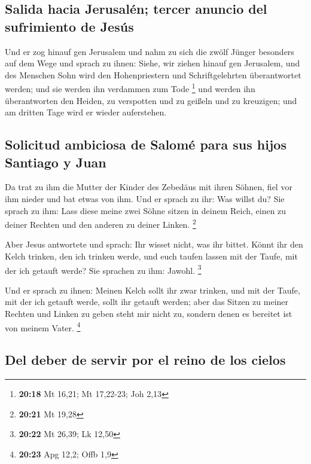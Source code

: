 \hypertarget{salida-hacia-jerusaluxe9n-tercer-anuncio-del-sufrimiento-de-jesuxfas}{%
\subsection{Salida hacia Jerusalén; tercer anuncio del sufrimiento de
Jesús}\label{salida-hacia-jerusaluxe9n-tercer-anuncio-del-sufrimiento-de-jesuxfas}}

 Und er zog hinauf gen Jerusalem und nahm zu sich die
zwölf Jünger besonders auf dem Wege und sprach zu ihnen: 
Siehe, wir ziehen hinauf gen Jerusalem, und des Menschen Sohn wird den
Hohenpriestern und Schriftgelehrten überantwortet werden; und sie werden
ihn verdammen zum Tode \footnote{\textbf{20:18} Mt 16,21; Mt 17,22-23;
  Joh 2,13}  und werden ihn überantworten den Heiden, zu
verspotten und zu geißeln und zu kreuzigen; und am dritten Tage wird er
wieder auferstehen.

\hypertarget{solicitud-ambiciosa-de-salomuxe9-para-sus-hijos-santiago-y-juan}{%
\subsection{Solicitud ambiciosa de Salomé para sus hijos Santiago y
Juan}\label{solicitud-ambiciosa-de-salomuxe9-para-sus-hijos-santiago-y-juan}}

 Da trat zu ihm die Mutter der Kinder des Zebedäus mit
ihren Söhnen, fiel vor ihm nieder und bat etwas von ihm. 
Und er sprach zu ihr: Was willst du? Sie sprach zu ihm: Lass diese meine
zwei Söhne sitzen in deinem Reich, einen zu deiner Rechten und den
anderen zu deiner Linken. \footnote{\textbf{20:21} Mt 19,28}

 Aber Jesus antwortete und sprach: Ihr wisset nicht, was
ihr bittet. Könnt ihr den Kelch trinken, den ich trinken werde, und euch
taufen lassen mit der Taufe, mit der ich getauft werde? Sie sprachen zu
ihm: Jawohl. \footnote{\textbf{20:22} Mt 26,39; Lk 12,50}

 Und er sprach zu ihnen: Meinen Kelch sollt ihr zwar
trinken, und mit der Taufe, mit der ich getauft werde, sollt ihr getauft
werden; aber das Sitzen zu meiner Rechten und Linken zu geben steht mir
nicht zu, sondern denen es bereitet ist von meinem Vater. \footnote{\textbf{20:23}
  Apg 12,2; Offb 1,9}

\hypertarget{del-deber-de-servir-por-el-reino-de-los-cielos}{%
\subsection{Del deber de servir por el reino de los
cielos}\label{del-deber-de-servir-por-el-reino-de-los-cielos}}

